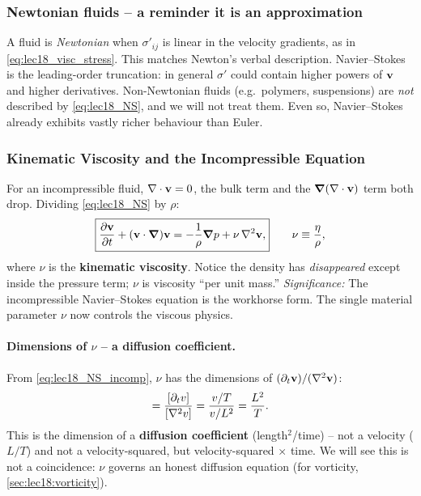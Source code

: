 \documentclass[../main.tex]{subfiles}
\begin{document}
\subsubsection*{Newtonian fluids -- a reminder it is an approximation}
A fluid is \emph{Newtonian} when $\sigma'_{ij}$ is linear in the velocity gradients, as in \eqref{eq:lec18_visc_stress}. This matches Newton's verbal description. Navier--Stokes is the leading-order truncation: in general $\sigma'$ could contain higher powers of $\mathbf{v}$ and higher derivatives. Non-Newtonian fluids (e.g.\ polymers, suspensions) are \emph{not} described by \eqref{eq:lec18_NS}, and we will not treat them. Even so, Navier--Stokes already exhibits vastly richer behaviour than Euler.

\subsubsection*{Kinematic Viscosity and the Incompressible Equation}
For an incompressible fluid, $\nabla \cdot\mathbf{v}=0$, the bulk term and the $\grad(\nabla \cdot\mathbf{v})$ term both drop. Dividing \eqref{eq:lec18_NS} by $\rho$:
\begin{equation}
  \boxed{\pdv{\mathbf{v}}{t} + (\mathbf{v}\cdot\grad)\mathbf{v} = -\frac{1}{\rho}\grad p + \nu\,\nabla^2\mathbf{v},}
  \qquad
  \nu \equiv \frac{\eta}{\rho},
  \label{eq:lec18_NS_incomp}
\end{equation}
where $\nu$ is the \textbf{kinematic viscosity}. Notice the density has \emph{disappeared} except inside the pressure term; $\nu$ is viscosity ``per unit mass.''
\textit{Significance:} The incompressible Navier--Stokes equation is the workhorse form. The single material parameter $\nu$ now controls the viscous physics.

\paragraph{Dimensions of $\nu$ -- a diffusion coefficient.} From \eqref{eq:lec18_NS_incomp}, $\nu$ has the dimensions of $(\partial_t\mathbf{v})/(\nabla^2\mathbf{v})$:
\begin{equation}
  [\nu] = \frac{[\partial_t v]}{[\lapl v]} = \frac{v/T}{v/L^2} = \frac{L^2}{T}.
  \label{eq:lec18_nu_dim}
\end{equation}
This is the dimension of a \textbf{diffusion coefficient} (length$^2$/time) -- not a velocity ($L/T$) and not a velocity-squared, but velocity-squared $\times$ time. We will see this is not a coincidence: $\nu$ governs an honest diffusion equation (for vorticity, \cref{sec:lec18:vorticity}).
\end{document}
